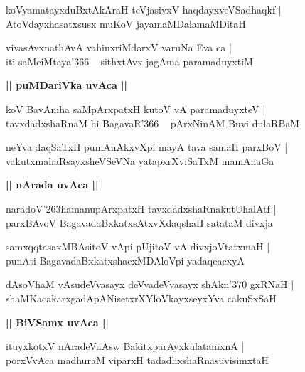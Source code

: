 \documentclass[twoside,12pt,openright]{book}
\def\S{\char'263}
\newcounter{shloka}[chapter]
\def\uvaca#1{\centerline{{\large\textbf{#1}}}}
\begin{document}
\begin{shloka}%
koVyamatayxduBxtAkAraH teVjasivxV haqdayxveVSadhaqkf |\\
AtoVdayxhasatxsusx muKoV jayamaMDalamaMDitaH 
\end{shloka}

\begin{shloka}%
vivasAvxnathAvA vahinxriMdorxV varuNa Eva ca |\\
iti saMciMtaya\char'366 ~ sithxtAvx jagAma paramaduyxtiM 
\end{shloka}

\uvaca{|| puMDariVka uvAca ||}

\begin{shloka}%
koV BavAniha saMpArxpatxH kutoV vA paramaduyxteV |\\
tavxdadxshaRnaM hi BagavaR\char'366 ~ pArxNinAM Buvi dulaRBaM 
\end{shloka}

\begin{shloka}%
neYva daqSaTxH pumAnAkxvXpi mayA tava samaH parxBoV |\\
vakutxmahaRsayxsheVSeVNa yatapxrXviSaTxM mamAnaGa
\end{shloka}

\uvaca{|| nArada uvAca ||}

\begin{shloka}%
naradoV\S hamanupArxpatxH tavxdadxshaRnakutUhalAtf |\\
parxBAvoV BagavadaBxkatxsAtxvXdaqshaH satataM divxja
\end{shloka}

\begin{shloka}%
samxqqtasaxMBAsitoV vApi pUjitoV vA divxjoVtatxmaH |\\
punAti BagavadaBxkatxshacxMDAloVpi yadaqcacxyA 
\end{shloka}

\begin{shloka}%
dAsoVhaM vAsudeVvasayx deVvadeVvasayx shAkn\char'370 gxRNaH |\\
shaMKacakarxgadApANisetxrXYloVkayxseyxYva cakuSxSaH
\end{shloka}

\uvaca{|| BiVSamx uvAca ||}

\begin{shloka}%
ituyxkotxV nAradeVnAsw BakitxparAyxkulatamxnA |\\
porxVvAca madhuraM viparxH tadadhxshaRnasuvisimxtaH 
\end{shloka}
\end{document}
